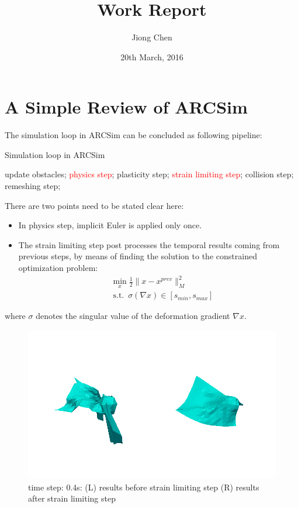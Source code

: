 \documentclass[a4paper,10pt]{article}
\title{Work Report}
\author{Jiong Chen}
\date{20th March, 2016}
\newcommand{\TODO}[1]{\textcolor{red}{#1}}
\DeclareMathOperator{\ST}{s.t.}
\begin{document}
\maketitle

\section{A Simple Review of ARCSim}
The simulation loop in ARCSim can be concluded as following pipeline:
\begin{algorithm}
\caption{Simulation loop in ARCSim} 
\begin{algorithmic}
\WHILE{ \TRUE } 
\STATE update obstacles;
\STATE \TODO{physics step};
\STATE plasticity step;
\STATE \TODO{strain limiting step};
\STATE collision step;
\STATE remeshing step;
\ENDWHILE
\end{algorithmic}
\end{algorithm}

There are two points need to be stated clear here:
\begin{itemize}
 \item In physics step, implicit Euler is applied only once.
 \item The strain limiting step post processes the temporal results coming from previous steps, by means of finding the solution to the constrained optimization problem:
 \begin{equation}
 \begin{split}
  &\min_{x} \frac{1}{2}\|x-x^{prev}\|_M^2 \\
  &\ST~ \sigma( \nabla x) \in [s_{min}, s_{max}]
 \end{split}
 \label{SL}
 \end{equation}
\end{itemize}
where $\sigma$ denotes the singular value of the deformation gradient $\nabla x$.

\begin{figure}[h]
 \centering
 \includegraphics[scale=0.4]{img/comp.png}
 \caption{time step: 0.4s: (L) results before strain limiting step (R) results after strain limiting step}
 \label{fig:1}
\end{figure}
\end{document}
